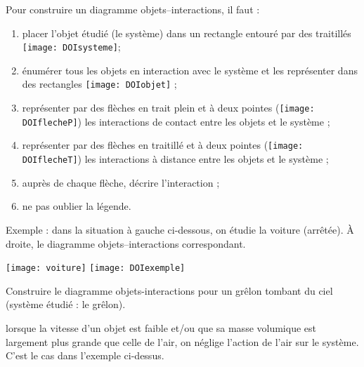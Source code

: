 \begin{methode}
\label{methodeDOI}

Pour construire un diagramme objets--interactions, il faut :
\begin{enumerate}
\item placer l'objet étudié (le système) dans un rectangle entouré par des traitillés \texttt{[image: DOIsysteme]};
\item énumérer tous les objets en interaction avec le système et les représenter dans des rectangles \texttt{[image: DOIobjet]} ; 
\item représenter par des flèches en trait plein et à deux pointes (\texttt{[image: DOIflecheP]}) les interactions de contact entre les objets et le système ;
\item représenter par des flèches en traitillé et à deux pointes (\texttt{[image: DOIflecheT]}) les interactions à distance entre les objets et le système ;
\item auprès de chaque flèche, décrire l'interaction ;
\item ne pas oublier la légende.
\end{enumerate}


\vspace{1em}

Exemple : dans la situation à gauche ci-dessous, on étudie la voiture (arrêtée). À droite, le diagramme objets--interactions correspondant.


\begin{center}
    \texttt{[image: voiture]}%
    \hfill%
    \texttt{[image: DOIexemple]}
\end{center}

\exercice
Construire le diagramme objets-interactions pour un grêlon tombant du ciel (système étudié : le grêlon).
\correction
\vspace{4cm}
\phantom{.}
\end{methode}


\begin{remarque}
lorsque la vitesse d'un objet est faible et/ou que sa masse volumique est largement plus grande que celle de l'air, on néglige l'action de l'air sur le système. C'est le cas dans l'exemple ci-dessus.
\end{remarque}

\vspace{1em}

